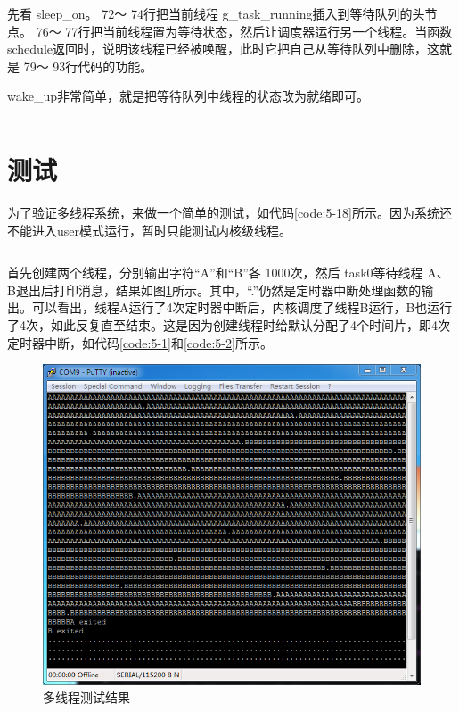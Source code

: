 \documentclass[main.tex]{subfiles}
\begin{document}
\begin{CJK*}{UTF8}{song}
先看 sleep\_\-on。 72～ 74行把当前线程 g\_\-task\_\-running插入到等待队列的头节点。 76～ 77行把当前线程置为等待状态，然后让调度器运行另一个线程。当函数 schedule返回时，说明该线程已经被唤醒，此时它把自己从等待队列中删除，这就是 79～ 93行代码的功能。

\par
 wake\_\-up非常简单，就是把等待队列中线程的状态改为就绪即可。
 
\begin{code}
\label{code:5-17}
\inputminted[firstline=63,lastline=108,linenos,numbersep=5pt,frame=lines,framesep=2mm]{c}{src/chapter05/kernel/task.c}
\end{code}

\section{测试}
为了验证多线程系统，来做一个简单的测试，如代码\ref{code:5-18}所示。因为系统还不能进入user模式运行，暂时只能测试内核级线程。

\begin{code}
\label{code:5-18}
\inputminted[firstline=504,lastline=537,linenos,numbersep=5pt,frame=lines,framesep=2mm]{c}{src/chapter05/kernel/machdep.c}
\end{code}

首先创建两个线程，分别输出字符“A”和“B”各 1000次，然后 task0等待线程 A、 B退出后打印消息，结果如图\ref{figure:5-2}所示。其中，“.”仍然是定时器中断处理函数的输出。可以看出，线程A运行了4次定时器中断后，内核调度了线程B运行，B也运行了4次，如此反复直至结束。这是因为创建线程时给默认分配了4个时间片，即4次定时器中断，如代码\ref{code:5-1}和\ref{code:5-2}所示。

\begin{figure}[htp]
\centering
\includegraphics[scale=0.4]{figures/5-2}
\caption{多线程测试结果}
\label{figure:5-2}
\end{figure}


\end{CJK*}
\end{document}
